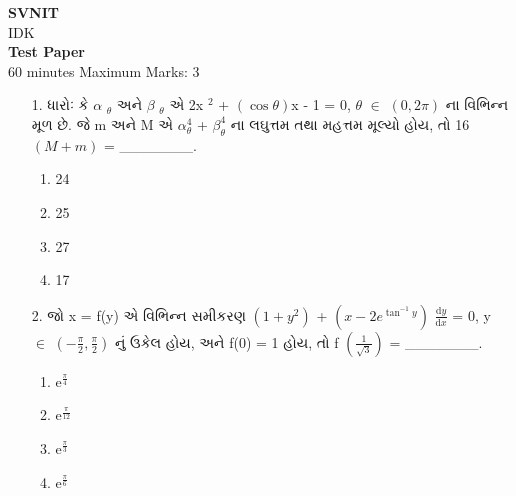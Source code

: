 \documentclass[12pt]{article}
\begin{document}
\begin{center}
\Large\textbf{SVNIT}\\[1cm]
\normalsize IDK\\[0.5cm]
\Large\textbf{Test Paper}\\[0.5cm]
\normalsize 60 minutes \hspace{1cm} Maximum Marks: 3\\[1cm]
\end{center}

\begin{enumerate}[leftmargin=*]

\item[1.] ધારોઃ કે \ensuremath{\alpha} \ensuremath{_{\ensuremath{\theta}}} અને \ensuremath{\beta} \ensuremath{_{\ensuremath{\theta}}} એ 2x \ensuremath{^{2}} + \ensuremath{\left( \ensuremath{\cos{\ensuremath{\theta}}} \right)}x - 1 = 0, \ensuremath{\theta} \ensuremath{\in} \ensuremath{\left( 0, 2\ensuremath{\pi} \right)} ના વિભિન્ન મૂળ છે. જે m અને M એ \ensuremath{\ensuremath{\alpha}_{\ensuremath{\theta}}^{4}} + \ensuremath{\ensuremath{\beta}_{\ensuremath{\theta}}^{4}} ના લઘુત્તમ તથા મહત્તમ મૂલ્યો હોય, તો 16 \ensuremath{\left( M + m \right)} = \_\_\_\_\_\_\_.\\[0.2em] \text{[1 marks]}


\begin{enumerate}[label=(\alph*)]
\item 24
\item 25
\item 27
\item 17
\end{enumerate}

\item[2.] જો x = f(y) એ વિભિન્ન સમીકરણ \ensuremath{\left( 1 + y \ensuremath{^{2}} \right)} + \ensuremath{\left( x - 2e \ensuremath{^{\ensuremath{\tan^{-1}{y}}}} \right)} \ensuremath{\frac{\mathrm{d}y}{\mathrm{d}x}} = 0, y \ensuremath{\in} \ensuremath{\left( -\ensuremath{\frac{\ensuremath{\pi}}{2}}, \ensuremath{\frac{\ensuremath{\pi}}{2}} \right)} નું ઉકેલ હોય, અને f(0) = 1 હોય, તો f \ensuremath{\left( \ensuremath{\frac{1}{\ensuremath{\sqrt{3}}}} \right)} = \_\_\_\_\_\_\_.\\[0.2em] \text{[1 marks]}


\begin{enumerate}[label=(\alph*)]
\item e\ensuremath{^{\ensuremath{\frac{\ensuremath{\pi}}{4}}}}
\item e\ensuremath{^{\ensuremath{\frac{\ensuremath{\pi}}{12}}}}
\item e\ensuremath{^{\ensuremath{\frac{\ensuremath{\pi}}{3}}}}
\item e\ensuremath{^{\ensuremath{\frac{\ensuremath{\pi}}{6}}}}
\end{enumerate}


\end{enumerate}
\end{document}
